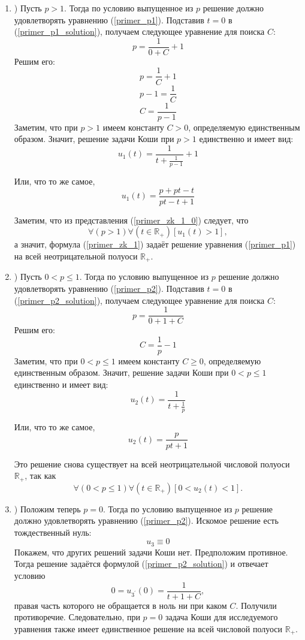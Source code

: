 \begin{enumerate}

\item)
Пусть $p>1$.
Тогда по условию выпущенное из $p$ решение должно удовлетворять уравнению (\ref{primer_p1}).
Подставив $t=0$ в (\ref{primer_p1_solution}), получаем следующее уравнение для поиска $C$:
$$
	p=\frac{1}{0+C}+1
$$
Решим его:
$$
	p=\frac{1}{C}+1
$$
$$
	p-1=\frac{1}{C}
$$
$$
	C=\frac{1}{p-1}
$$
Заметим, что при $p>1$ имеем константу $C>0$, определяемую единственным образом.
Значит, решение задачи Коши при $p>1$ единственно и имеет вид:
\begin{equation}\label{primer_zk_1_0}
	u_1(t)=\frac{1}{t+\frac{1}{p-1}}+1
\end{equation}

Или, что то же самое,
\begin{equation}\label{primer_zk_1}
	u_1(t)=\frac{p+pt-t}{pt-t+1}
\end{equation}

Заметим, что из представления (\ref{primer_zk_1_0}) следует, что
$$
	\forall(p>1)\forall\left(t \in \mathbb{R}_+\right)\left[u_1(t) > 1\right],
$$
а значит, формула (\ref{primer_zk_1}) задаёт решение уравнения (\ref{primer_p1}) на всей неотрицательной полуоси $\mathbb{R}_+$.

\item)
Пусть $0<p \leq 1$.
Тогда по условию выпущенное из $p$ решение должно удовлетворять уравнению (\ref{primer_p2}).
Подставив $t=0$ в (\ref{primer_p2_solution}), получаем следующее уравнение для поиска $C$:
$$
	p=\frac{1}{0+1+C}
$$
Решим его:
$$
	C=\frac{1}{p}-1
$$
Заметим, что при $0<p \leq 1$ имеем константу $C \geq 0$, определяемую единственным образом.
Значит, решение задачи Коши при $0<p \leq 1$ единственно и имеет вид:
\begin{equation}\label{primer_zk_2_0}
	u_2(t)=\frac{1}{t+\frac{1}{p}}
\end{equation}

Или, что то же самое,
\begin{equation}\label{primer_zk_2}
	u_2(t)=\frac{p}{pt+1}
\end{equation}

Это решение снова существует на всей неотрицательной числовой полуоси $\mathbb{R}_+$, так как
$$
	\forall(0<p \leq 1)\forall\left(t \in \mathbb{R}_+\right)\left[0 < u_2(t) < 1\right].
$$

\item)
Положим теперь $p=0$.
Тогда по условию выпущенное из $p$ решение должно удовлетворять уравнению (\ref{primer_p2}).
Искомое решение есть тождественный нуль:
\begin{equation}\label{primer_zk_3}
	u_3 \equiv 0
\end{equation}
Покажем, что других решений задачи Коши нет.
Предположим противное.
Тогда решение задаётся формулой (\ref{primer_p2_solution}) и отвечает условию
$$
	0=u_{3^{'}}(0)=\frac{1}{t+1+C},
$$
правая часть которого не обращается в ноль ни при каком $C$.
Получили противоречие.
Следовательно, при $p=0$ задача Коши для исследуемого уравнения также имеет единственное решение на всей числовой полуоси $\mathbb{R}_+$.


\end{enumerate}
